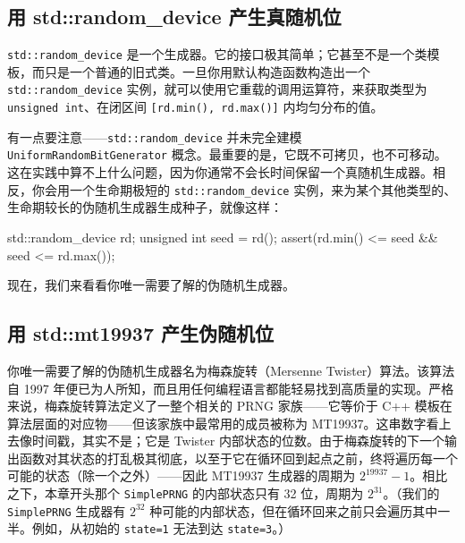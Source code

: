 \subsection{用 std::random\_\allowbreak{}device 产生真随机位}

\texttt{std::\allowbreak{}random\_\allowbreak{}device} 是一个生成器。它的接口极其简单；它甚至不是一个类模板，而只是一个普通的旧式类。一旦你用默认构造函数构造出一个 \texttt{std::\allowbreak{}random\_\allowbreak{}device} 实例，就可以使用它重载的调用运算符，来获取类型为 \texttt{unsigned int}、在闭区间 \texttt{[rd.\allowbreak{}min(\allowbreak{})\allowbreak{},\allowbreak{} rd.\allowbreak{}max(\allowbreak{})\allowbreak{}]} 内均匀分布的值。

有一点要注意——\texttt{std::\allowbreak{}random\_\allowbreak{}device} 并未完全建模 \texttt{Uniform\allowbreak{}Random\allowbreak{}Bit\allowbreak{}Generator} 概念。最重要的是，它既不可拷贝，也不可移动。这在实践中算不上什么问题，因为你通常不会长时间保留一个真随机生成器。相反，你会用一个生命期极短的 \texttt{std::\allowbreak{}random\_\allowbreak{}device} 实例，来为某个其他类型的、生命期较长的伪随机生成器生成种子，就像这样：

\begin{codebox}[cpp]
     std::random_device rd;
     unsigned int seed = rd();
     assert(rd.min() <= seed && seed <= rd.max());
\end{codebox}

现在，我们来看看你唯一需要了解的伪随机生成器。

\subsection{用 std::mt19937 产生伪随机位}

你唯一需要了解的伪随机生成器名为梅森旋转（Mersenne Twister）算法。该算法自 1997 年便已为人所知，而且用任何编程语言都能轻易找到高质量的实现。严格来说，梅森旋转算法定义了一整个相关的 PRNG 家族——它等价于 C++ 模板在算法层面的对应物——但该家族中最常用的成员被称为 MT19937。这串数字看上去像时间戳，其实不是；它是 Twister 内部状态的位数。由于梅森旋转的下一个输出函数对其状态的打乱极其彻底，以至于它在循环回到起点之前，终将遍历每一个可能的状态（除一个之外）——因此 MT19937 生成器的周期为 $2^{19937}-1$。相比之下，本章开头那个 \texttt{Simple\allowbreak{}PRNG} 的内部状态只有 32 位，周期为 $2^{31}$。（我们的 \texttt{Simple\allowbreak{}PRNG} 生成器有 $2^{32}$ 种可能的内部状态，但在循环回来之前只会遍历其中一半。例如，从初始的 \texttt{state=1} 无法到达 \texttt{state=3}。）

